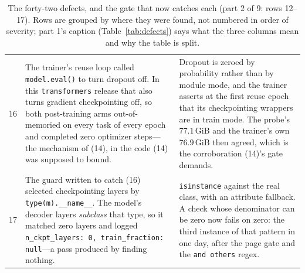 \documentclass{article}
\begin{document}
\begin{table}[p]
\begin{tabular}{@{}p{0.6cm}p{7.3cm}p{7.3cm}@{}}
16 & The trainer's reuse loop called \texttt{model.eval()} to turn dropout off.  In this \texttt{transformers} release that also turns gradient checkpointing off, so both post-training arms out-of-memoried on every task of every epoch and completed zero optimizer steps---the mechanism of (14), in the code (14) was supposed to bound. & Dropout is zeroed by probability rather than by module mode, and the trainer asserts at the first reuse epoch that its checkpointing wrappers are in train mode.  The probe's $77.1$\,GiB and the trainer's own $76.9$\,GiB then agreed, which is the corroboration (14)'s gate demands. \\
17 & The guard written to catch (16) selected checkpointing layers by \texttt{type(m).\_\_name\_\_}.  The model's decoder layers \emph{subclass} that type, so it matched zero layers and logged \texttt{n\_ckpt\_layers: 0, train\_fraction: null}---a pass produced by finding nothing. & \texttt{isinstance} against the real class, with an attribute fallback.  A check whose denominator can be zero now fails on zero: the third instance of that pattern in one day, after the page gate and the \texttt{and others} regex. \\
\bottomrule
\end{tabular}
\caption{The forty-two defects, and the gate that now catches each (part 2 of 9: rows 12--17).  Rows are grouped by where they were found, not numbered in order of severity; part 1's caption (Table~\ref{tab:defects}) says what the three columns mean and why the table is split.}
\label{tab:defectsb}
\end{table}
\end{document}
